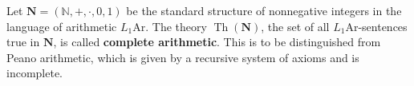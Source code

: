 Let $\mathbf{N} = (\mathbb{N}, +, \cdot, 0, 1)$ be the standard structure of nonnegative integers in the language of arithmetic $L_1\mathrm{Ar}$. The theory $\operatorname{Th}(\mathbf{N})$, the set of all $L_1\mathrm{Ar}$-sentences true in $\mathbf{N}$, is called \textbf{complete arithmetic}. This is to be distinguished from Peano arithmetic, which is given by a recursive system of axioms and is incomplete.

